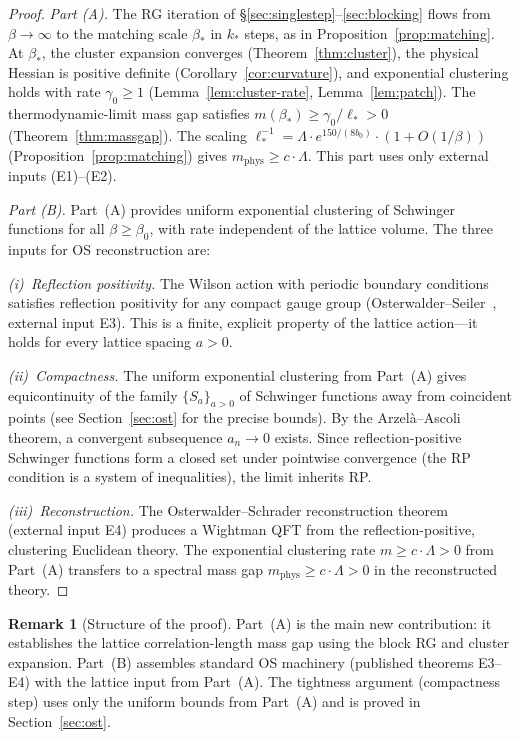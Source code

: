 \documentclass[11pt]{article}
\theoremstyle{definition}
\newtheorem{remark}[theorem]{Remark}
\begin{document}
\begin{proof}
\emph{Part (A).}
The RG iteration of \S\ref{sec:singlestep}--\ref{sec:blocking}
flows from $\beta\to\infty$ to the matching scale $\beta_*$ in $k_*$
steps, as in Proposition~\ref{prop:matching}.  At $\beta_*$,
the cluster expansion converges (Theorem~\ref{thm:cluster}), the
physical Hessian is positive definite
(Corollary~\ref{cor:curvature}),
and exponential clustering holds with rate $\gamma_0\ge 1$
(Lemma~\ref{lem:cluster-rate}, Lemma~\ref{lem:patch}).
The thermodynamic-limit
mass gap satisfies
$m(\beta_*)\ge\gamma_0/\ell_*>0$ (Theorem~\ref{thm:massgap}).
The scaling $\ell_*^{-1}=\Lambda\cdot e^{150/(8b_0)}\cdot(1+O(1/\beta))$
(Proposition~\ref{prop:matching}) gives $m_{\mathrm{phys}}\ge c\cdot\Lambda$.
This part uses only external inputs (E1)--(E2).

\emph{Part (B).}
Part~(A) provides uniform exponential clustering of Schwinger
functions for all $\beta\ge\beta_0$, with rate independent of the
lattice volume.  The three inputs for OS reconstruction are:

\emph{(i)~Reflection positivity.}
The Wilson action with periodic boundary conditions satisfies
reflection positivity for any compact gauge group
(Osterwalder--Seiler~\cite{OS78}, external input E3).
This is a finite, explicit property of the lattice action---it
holds for every lattice spacing $a>0$.

\emph{(ii)~Compactness.}
The uniform exponential clustering from Part~(A) gives
equicontinuity of the family $\{S_a\}_{a>0}$ of Schwinger functions
away from coincident points (see Section~\ref{sec:ost} for
the precise bounds).  By the Arzel\`a--Ascoli theorem,
a convergent subsequence $a_n\to 0$ exists.
Since reflection-positive Schwinger functions form a closed set
under pointwise convergence (the RP condition is a system of
inequalities), the limit inherits RP.

\emph{(iii)~Reconstruction.}
The Osterwalder--Schrader reconstruction theorem~\cite{OS73}
(external input E4) produces a Wightman QFT from the
reflection-positive, clustering Euclidean theory.
The exponential clustering rate $m\ge c\cdot\Lambda>0$
from Part~(A) transfers to a spectral mass gap
$m_{\mathrm{phys}}\ge c\cdot\Lambda>0$ in the
reconstructed theory.
\end{proof}

\begin{remark}[Structure of the proof]%
\label{rem:proof-structure}
Part~(A) is the main new contribution: it establishes the
lattice correlation-length mass gap using the block RG and
cluster expansion.  Part~(B) assembles standard OS machinery
(published theorems E3--E4) with the lattice input from
Part~(A).  The tightness argument (compactness step) uses
only the uniform bounds from Part~(A) and is proved in
Section~\ref{sec:ost}.
\end{remark}
\end{document}
